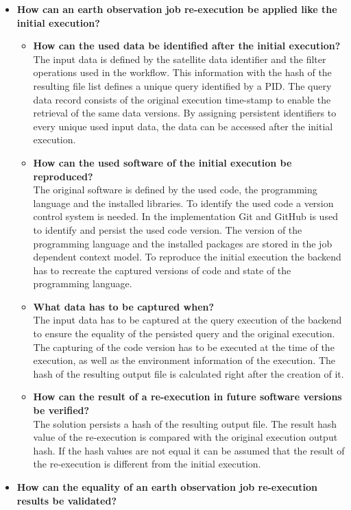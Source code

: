 \documentclass[draft,final]{vutinfth} %
\begin{document}
\begin{itemize}
	\item \textbf{How can an earth observation job re-execution be applied like the initial execution?}
	\begin{itemize}
		\item \textbf{How can the used data be identified after the initial execution?} \\
		The input data is defined by the satellite data identifier and the filter operations used in the workflow. This information with the hash of the resulting file list defines a unique query identified by a PID. The query data record consists of the original execution time-stamp to enable the retrieval of the same data versions. By assigning persistent identifiers to every unique used input data, the data can be accessed after the initial execution.    
		\item \textbf{How can the used software of the initial execution be reproduced?} \\
		The original software is defined by the used code, the programming language and the installed libraries. To identify the used code a version control system is needed. In the implementation Git and GitHub is used to identify and persist the used code version. The version of the programming language and the installed packages are stored in the job dependent context model. To reproduce the initial execution the backend has to recreate the captured versions of code and state of the programming language.       
		\item \textbf{What data has to be captured when?} \\
		The input data has to be captured at the query execution of the backend to ensure the equality of the persisted query and the original execution. The capturing of the code version has to be executed at the time of the execution, as well as the environment information of the execution. The hash of the resulting output file is calculated right after the creation of it.  
		\item \textbf{How can the result of a re-execution in future software versions be verified?} \\
		The solution persists a hash of the resulting output file. The result hash value of the re-execution is compared with the original execution output hash. If the hash values are not equal it can be assumed that the result of the re-execution is different from the initial execution. 
	\end{itemize}
	\item \textbf{How can the equality of an earth observation job re-execution results be validated?}

\end{itemize}
\end{document}
